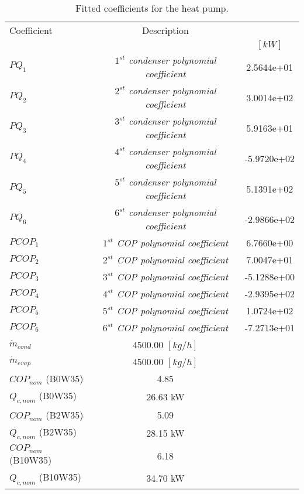\documentclass[english]{SPFShortReport}
\author{Dani Carbonell}
\begin{document}
\begin{table}[!ht]
\begin{small}
\caption{Fitted coefficients for the heat pump.}
\begin{center}
\resizebox{12cm}{!} 
{
\begin{tabular}{l | c c } 
\hline
\hline
Coefficient &Description & \\ 
 & &$[kW]$\\ 
\hline
$PQ_{1}$ & \emph{$1^{st}$ condenser polynomial coefficient}  & 2.5644e+01    \\ 
$PQ_{2}$ & \emph{$2^{st}$ condenser polynomial coefficient}  & 3.0014e+02    \\ 
$PQ_{3}$ & \emph{$3^{st}$ condenser polynomial coefficient}  & 5.9163e+01    \\ 
$PQ_{4}$ & \emph{$4^{st}$ condenser polynomial coefficient}  & -5.9720e+02    \\ 
$PQ_{5}$ & \emph{$5^{st}$ condenser polynomial coefficient}  & 5.1391e+02    \\ 
$PQ_{6}$ & \emph{$6^{st}$ condenser polynomial coefficient}  & -2.9866e+02    \\ 
\hline
$PCOP_{1}$ & \emph{$1^{st}$ COP polynomial coefficient}  & 6.7660e+00    \\ 
$PCOP_{2}$ & \emph{$2^{st}$ COP polynomial coefficient}  & 7.0047e+01    \\ 
$PCOP_{3}$ & \emph{$3^{st}$ COP polynomial coefficient}  & -5.1288e+00    \\ 
$PCOP_{4}$ & \emph{$4^{st}$ COP polynomial coefficient}  & -2.9395e+02    \\ 
$PCOP_{5}$ & \emph{$5^{st}$ COP polynomial coefficient}  & 1.0724e+02    \\ 
$PCOP_{6}$ & \emph{$6^{st}$ COP polynomial coefficient}  & -7.2713e+01    \\ 
\hline
$\dot m_{cond}$ & 4500.00 $[kg/h]$\\ 
$\dot m_{evap}$ & 4500.00 $[kg/h]$\\ 
\hline
$COP_{nom}$ (B0W35)& 4.85 \\ 
$Q_{c,nom}$ (B0W35)& 26.63 kW\\ 
$COP_{nom}$ (B2W35)& 5.09 \\ 
$Q_{c,nom}$ (B2W35)& 28.15 kW\\ 
$COP_{nom}$ (B10W35)& 6.18 \\ 
$Q_{c,nom}$ (B10W35)& 34.70 kW\\ 
\hline
\hline
\end{tabular}
}
\label{CoefTable}
\end{center}
\end{small}
\end{table}
\end{document}
